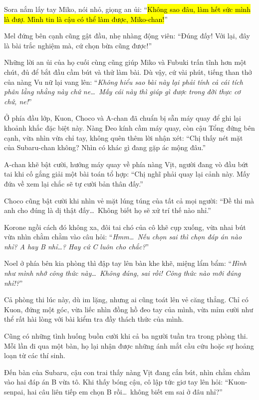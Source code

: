 \documentclass[../main.tex]{subfiles}
\begin{document}
Sora nắm lấy tay Miko, nói nhỏ, giọng an ủi: ``\hl{Không sao đâu, làm hết sức mình là đượ. Mình tin là cậu có thể làm được, Miko-chan!}''

Mel đứng bên cạnh cũng gật đầu, nhẹ nhàng động viên: ``Đúng đấy! Với lại, đây là bài trắc nghiệm mà, cứ chọn bừa cũng được!''

Những lời an ủi của họ cuối cùng cũng giúp Miko và Fubuki trấn tĩnh hơn một chút, đủ để bắt đầu cầm bút và thử làm bài. Dù vậy, cứ vài phút, tiếng than thở của nàng Vu nữ lại vang lên: ``\textit{Không hiểu sao bài này lại phải tính cả cái tích phân lằng nhằng này chứ ne\dots\ Mấy cái này thì giúp gì được trong đời thực cơ chứ, ne!}''

Ở phía đầu lớp, Kuon, Choco và A-chan đã chuẩn bị sẵn máy quay để ghi lại khoảnh khắc đặc biệt này. Nàng Đeo kính cầm máy quay, còn cậu Tổng đứng bên cạnh, vừa nhìn vừa chỉ tay, không quên thêm lời nhận xét: ``Chị thấy nét mặt của Subaru-chan không? Nhìn có khác gì đang gặp ác mộng đâu.''

A-chan khẽ bật cười, hướng máy quay về phía nàng Vịt, người đang vò đầu bứt tai khi cố gắng giải một bài toán tổ hợp: ``Chị nghĩ phải quay lại cảnh này. Mấy đứa về xem lại chắc sẽ tự cười bản thân đấy.''

Choco cũng bật cười khi nhìn vẻ mặt lúng túng của tất cả mọi người: ``Đề thi mà anh cho đúng là dị thật đấy\dots\ Không biết họ sẽ xử trí thế nào nhỉ.''

Korone ngồi cách đó không xa, đôi tai chó của cô khẽ cụp xuống, vừa nhai bút vừa nhìn chằm chằm vào câu hỏi: ``\textit{Hmm\dots\ Nếu chọn sai thì chọn đáp án nào nhỉ? A hay B nhỉ\dots? Hay cứ C luôn cho chắc?}''

Noel ở phía bên kia phòng thì đập tay lên bàn khe khẽ, miệng lẩm bẩm: ``\textit{Hình như mình nhớ công thức này\dots\ Không đúng, sai rồi! Công thức nào mới đúng nhỉ!?}''

Cả phòng thi lúc này, dù im lặng, nhưng ai cũng toát lên vẻ căng thẳng. Chỉ có Kuon, đứng một góc, vừa liếc nhìn đồng hồ đeo tay của mình, vừa mỉm cười như thể rất hài lòng với bài kiểm tra đầy thách thức của mình.

\ct

Cũng có những tình huống buồn cười khi cả ba người tuần tra trong phòng thi. Mỗi lần đi qua một bàn, họ lại nhận được những ánh mắt cầu cứu hoặc sự hoảng loạn từ các thí sinh.

Đến bàn của Subaru, cậu con trai thấy nàng Vịt đang cắn bút, nhìn chằm chằm vào hai đáp án B vừa tô. Khi thấy bóng cậu, cô lập tức giơ tay lên hỏi: ``Kuon-senpai, hai câu liên tiếp em chọn B rồi\dots\ không biết em sai ở đâu nhỉ?''
\end{document}
